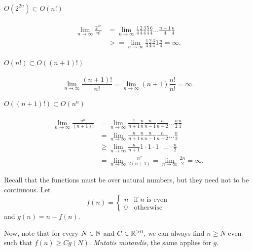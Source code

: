 \paragraph{$O(2^{2n}) \subset O(n!)$}
\begin{align*}
    \lim_{n \to \infty} \frac{2^{2n}}{n!} &= \lim_{n \to \infty} \frac{1}{4}\frac{2}{4}\frac{3}{4}\frac{5}{4}\frac{6}{4}\ldots \frac{n-1}{4} \frac{n}{4} \\
    &>= \lim_{n \to \infty} \frac{1}{4}\frac{2}{4}\frac{3}{4} 1 \frac{n}{4} = \infty
.\end{align*}

\paragraph{$O(n!) \subset O((n+1)!)$}
\[
    \lim_{n \to \infty} \frac{(n+1)!}{n!} = \lim_{n \to \infty} (n+1)\frac{n!}{n!} = \infty
.\] 

\paragraph{$O((n+1)!) \subset O(n^{n})$}
\begin{align*}
    \lim_{n \to \infty} \frac{n^{n}}{(n+1)!} &= \lim_{n \to \infty} \frac{1}{n+1} \frac{n}{n} \frac{n}{n-1} \frac{n}{n-2} \ldots \frac{n}{2}\frac{n}{1} \\
    &= \lim_{n \to \infty} \frac{n}{n+1}\frac{n}{n} \frac{n}{n-1} \frac{n}{n-2} \ldots \frac{n}{2} \\
    &\ge \lim_{n \to \infty} \frac{n}{n+1} 1 \cdot 1\cdot 1\cdot \ldots\cdot \frac{n}{2}  \\
    &= \lim_{n \to \infty} \frac{n^2}{2(n+1)} = \lim_{n \to \infty} \frac{2n}{2} = \infty
.\end{align*}


Recall that the functions must be over natural numbers, but they need not to be continuous.
Let \[
f(n) = \begin{cases}
    n & \text{if }n\text{ is even} \\
    0 & \text{otherwise}
\end{cases}
\] and $g(n) = n - f(n)$.

Now, note that for every $N\in \mathbb{N}$ and $C \in \mathbb{R}^{>0}$, we can always find $n \ge N$ even such that $f(n) \ge Cg(N)$.
\emph{Mutatis mutandis}, the same applies for $g$.



